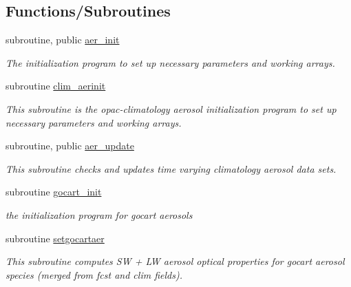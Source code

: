 \subsection*{Functions/\+Subroutines}
\begin{DoxyCompactItemize}
\item 
subroutine, public \hyperlink{namespacemodule__radiation__aerosols_a6086afe5183a09ca64810af7fe2a12ac}{aer\+\_\+init}                                                                                           
\begin{DoxyCompactList}\small\item\em The initialization program to set up necessary parameters and working arrays. \end{DoxyCompactList}\item 
subroutine \hyperlink{namespacemodule__radiation__aerosols_a30bd5bb6d72adc8f635e6718e2541f5f}{clim\+\_\+aerinit}                                                                                   
\begin{DoxyCompactList}\small\item\em This subroutine is the opac-\/climatology aerosol initialization program to set up necessary parameters and working arrays. \end{DoxyCompactList}\item 
subroutine, public \hyperlink{namespacemodule__radiation__aerosols_a2a91dba33725576c80b4b0f556031707}{aer\+\_\+update}                                                                                       
\begin{DoxyCompactList}\small\item\em This subroutine checks and updates time varying climatology aerosol data sets. \end{DoxyCompactList}\item 
subroutine \hyperlink{namespacemodule__radiation__aerosols_a5db43ed91d1c7c83dfee64f12f2bf354}{gocart\+\_\+init}                                                                                     
\begin{DoxyCompactList}\small\item\em the initialization program for gocart aerosols \end{DoxyCompactList}\item 
subroutine \hyperlink{namespacemodule__radiation__aerosols_abb28d29c21a8905eda601bfe5bfb3df4}{setgocartaer}                                                                                   
\begin{DoxyCompactList}\small\item\em This subroutine computes SW + LW aerosol optical properties for gocart aerosol species (merged from fcst and clim fields). \end{DoxyCompactList}\end{DoxyCompactItemize}
